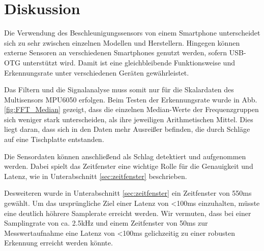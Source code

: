 \section{Diskussion}
Die Verwendung des Beschleunigungssensors von einem Smartphone unterscheidet sich zu sehr zwischen einzelnen Modellen und Herstellern.
Hingegen können externe Sensoren an verschiedenen Smartphones genutzt werden, sofern USB-OTG unterstützt wird.
Damit ist eine gleichbleibende Funktionsweise und Erkennungsrate unter verschiedenen Geräten gewährleistet.

Das Filtern und die Signalanalyse muss somit nur für die Skalardaten des Multisensors MPU6050 erfolgen.
Beim Testen der Erkennungsrate wurde in Abb. \ref{fig:FFT_Median} gezeigt, dass die einzelnen Median-Werte der Frequenzgruppen sich weniger stark unterscheiden, als ihre jeweiligen Arithmetischen Mittel.
Dies liegt daran, dass sich in den Daten mehr Ausreißer befinden, die durch Schläge auf eine Tischplatte entstanden.

Die Sensordaten können anschließend als Schlag detektiert und aufgenommen werden.
Dabei spielt das Zeitfenster eine wichtige Rolle für die Genauigkeit und Latenz, wie in Unterabschnitt \ref{sec:zeitfenster} beschrieben.

Desweiteren wurde in Unterabschnitt \ref{sec:zeitfenster} ein Zeitfenster von 550ms gewählt.
Um das ursprüngliche Ziel einer Latenz von <100ms einzuhalten, müsste eine deutlich höhrere Samplerate erreicht werden. Wir vermuten, dass bei einer Samplingrate von ca. 2.5kHz und einem Zeitfenster von 50ms zur Messwertaufnahme eine Latenz von <100ms gelichzeitig zu einer robusten Erkennung erreicht werden könnte.

